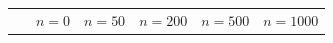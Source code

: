 \documentclass[12pt, reqno]{report}
\theoremstyle{definition}
\theoremstyle{remark}
\begin{document}
\begin{figure}[H]




    \def\subheight{.115\paperwidth}
    \centering
    \begin{tabular}{rccccc}

        ~ & $n=0$ & $n=50$ & $n=200$ & $n=500$ & $n=1000$ \\
        

\end{tabular}
\end{figure}
\end{document}
